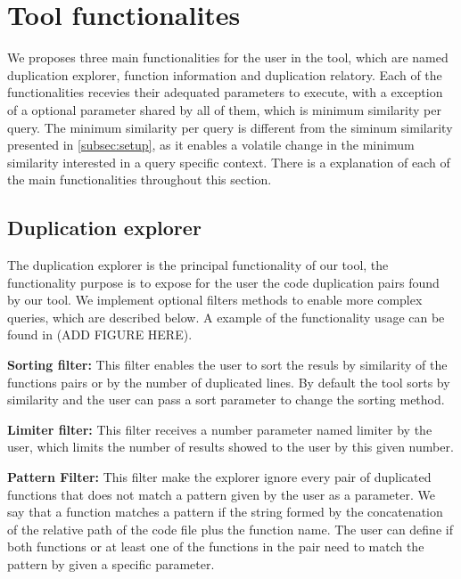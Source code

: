 \en

\section{Tool functionalites}
\label{subsec:func}

We proposes three main functionalities for the user in the tool, which are named duplication explorer, function information
and duplication relatory. Each of the functionalities recevies their adequated parameters to execute, with a exception
of a optional parameter shared by all of them, which is minimum similarity per query. The minimum similarity per query is different
from the siminum similarity presented in \ref{subsec:setup}, as it enables a volatile change in the minimum similarity
interested in a query specific context. There is a explanation of each of the main functionalities throughout this section.

\subsection{Duplication explorer}

The duplication explorer is the principal functionality of our tool, the functionality purpose is to expose for the user the code duplication
pairs found by our tool. We implement optional filters methods to enable more complex queries, which are described below. A example
of the functionality usage can be found in (ADD FIGURE HERE).


\begin{itemize}
	\begin{item}
		\textbf{Sorting filter:} This filter enables the user to sort the resuls by similarity of the functions pairs or 
		by the number of duplicated lines. By default the tool sorts by similarity and the user can pass a sort parameter to change
		the sorting method.
	\end{item}

	\begin{item}
		\textbf{Limiter filter:} This filter receives a number parameter named limiter by the user, which limits the number of results
		showed to the user by this given number.
	\end{item}

	\begin{item}
		\textbf{Pattern Filter:} This filter make the explorer ignore every pair of duplicated functions that does not match a pattern
		given by the user as a parameter. We say that a function matches a pattern if the string formed by the concatenation of
		the relative path of the code file plus the function name. The user can define if both functions or at least one of the 
		functions in the pair need to match the pattern by given a specific parameter.
	\end{item}
\end{itemize}


